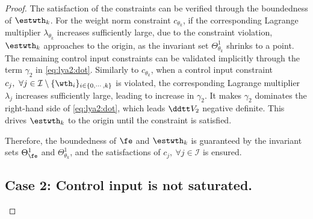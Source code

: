 \documentclass[journal]{IEEEtran}
\begin{document}
\begin{proof}
The satisfaction of the constraints can be verified through the boundedness of $\estwth_k$.
For the weight norm constraint $c_{\theta_k}$, if the corresponding Lagrange multiplier $\lambda_{\theta_k}$ increases sufficiently large, due to the constraint violation, $\estwth_k$ approaches to the origin, as the invariant set $\Theta_{\theta_k}^{1}$ shrinks to a point.
The remaining control input constraints can be validated implicitly through the term ${\gamma}_2$ in \eqref{eq:lya2:dot}.
Similarly to $c_{\theta_k}$, when a control input constraint $c_j,\ \forall j\in\mathcal{I}\setminus \{\wth_i\}_{i\in\{0,\cdots,k\}}$ is violated, the corresponding Lagrange multiplier $\lambda_j$ increases sufficiently large, leading to increase in ${\gamma}_2$.
It makes ${\gamma}_2$ dominates the right-hand side of \eqref{eq:lya2:dot}, which leads $\ddtt V_2$ negative definite.
This drives $\estwth_k$ to the origin until the constraint is satisfied.

Therefore, the boundedness of $\fe$ and $\estwth_k$ is guaranteed by the invariant sets $\Theta_{\fe}^{1}$ and $\Theta_{\theta_k}^{1}$, and the satisfactions of $c_j,\ \forall j\in\mathcal{I}$ is ensured.

\subsection*{Case 2: Control input is not saturated.}


\end{proof}
\end{document}
